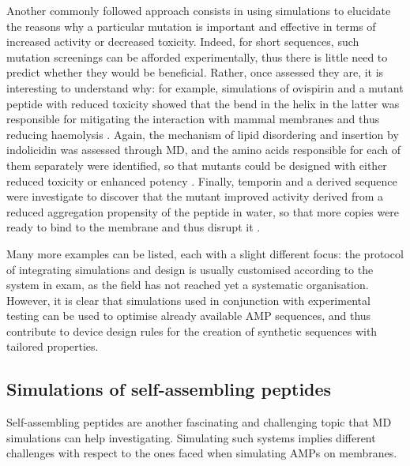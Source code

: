 Another commonly followed approach consists in using simulations to elucidate the reasons why a particular mutation is important and effective in terms of increased activity or decreased toxicity. Indeed, for short sequences, such mutation screenings can be afforded experimentally, thus there is little need to predict whether they would be beneficial. Rather, once assessed they are, it is interesting to understand why: for example, simulations of ovispirin and a mutant peptide with reduced toxicity showed that the bend in the helix in the latter was responsible for mitigating the interaction with mammal membranes and thus reducing haemolysis \cite{Khandelia2005}. Again, the mechanism of lipid disordering and insertion by indolicidin was assessed through MD, and the amino acids responsible for each of them separately were identified, so that mutants could be designed with either reduced toxicity or enhanced potency \cite{Tsai2009}. Finally, temporin and a derived sequence were investigate to discover that the mutant improved activity derived from a reduced aggregation propensity of the peptide in water, so that more copies were ready to bind to the membrane and thus disrupt it \cite{Farrotti2017}.

Many more examples can be listed, each with a slight different focus: the protocol of integrating simulations and design is usually customised according to the system in exam, as the field has not reached yet a systematic organisation.
%
However, it is clear that simulations used in conjunction with experimental testing can be used to optimise  already available AMP sequences, and thus contribute to device design rules for the creation of synthetic sequences with tailored properties.


\subsection{Simulations of self-assembling peptides}
Self-assembling peptides are another fascinating and challenging topic that MD simulations can help investigating. Simulating such systems implies different challenges with respect to the ones faced when simulating AMPs on membranes.

